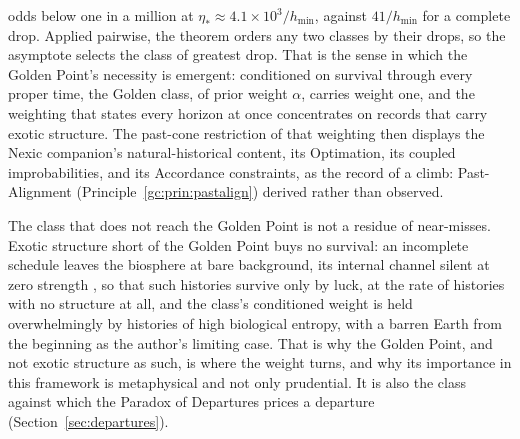 \begin{remark}
odds below one in a million at $\eta_\ast\approx4.1\times10^{3}/h_{\min}$,
against $41/h_{\min}$ for a complete drop. Applied pairwise, the theorem
orders any two classes by their drops, so the asymptote selects the
class of greatest drop. That is the sense in which the Golden Point's
necessity is emergent: conditioned on survival through every proper
time, the Golden class, of prior weight $\alpha$, carries weight one, and
the weighting that states every horizon at once concentrates on records
that carry exotic structure. The past-cone restriction of that weighting
then displays the Nexic companion's natural-historical content, its
Optimation, its coupled improbabilities, and its Accordance constraints,
as the record of a climb: Past-Alignment
(Principle~\ref{gc:prin:pastalign}) derived rather than observed.

The class that does not reach the Golden Point is not a residue of
near-misses. Exotic structure short of the Golden Point buys no
survival: an incomplete schedule leaves the biosphere at bare background,
its internal channel silent at zero strength
\cite{GoldenTechnoanatomy}, so that such histories survive only by luck,
at the rate of histories with no structure at all, and the class's
conditioned weight is held overwhelmingly by histories of high
biological entropy, with a barren Earth from the beginning as the
author's limiting case. That is why the Golden Point, and not exotic
structure as such, is where the weight turns, and why its importance in
this framework is metaphysical and not only prudential. It is also the
class against which the Paradox of Departures prices a departure
(Section~\ref{sec:departures}).
\end{remark}

